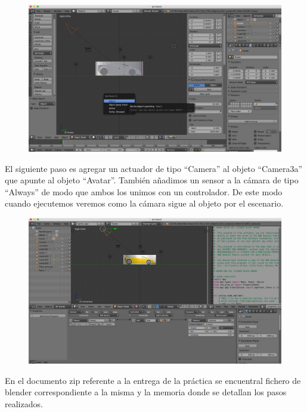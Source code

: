 \documentclass[10pt]{article}
\begin{document}
\begin{figure}[H]
	\begin{center}
	 		\includegraphics[width = 1.00\textwidth]{Imagenes/p4-img21}
	\end{center} 
\end{figure}

El siguiente paso es agregar un actuador de tipo ``Camera'' al objeto ``Camera3a'' que apunte al objeto ``Avatar''. También añadimos un sensor a la cámara de tipo ``Always''  de modo que ambos los unimos con un controlador. De este modo cuando ejecutemos veremos como la cámara sigue al objeto por el escenario. \\

\begin{figure}[H]
	\begin{center}
	 		\includegraphics[width = 1.00\textwidth]{Imagenes/p4-img22}
	\end{center} 
\end{figure}

En el documento zip referente a la entrega de la práctica se encuentral fichero de blender correspondiente a la misma y la memoria donde se detallan los pasos realizados.
\end{document}
